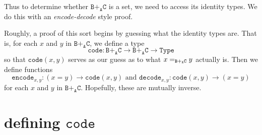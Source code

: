 \documentclass[12pt]{amsart}
\newcommand{\from}{\colon}
\newcommand{\type}[1]{\mathtt{#1}}
\newcommand{\A}{\type{A}}
\newcommand{\B}{\type{B}}
\newcommand{\C}{\type{C}}
\newcommand{\BAC}{\B +_{\A} \C}
\newcommand{\Type}{\type{Type}}
\newcommand{\code}{\type{code}}
\theoremstyle{remark}
\theoremstyle{definition}
\begin{document}
Thus to determine whether $\BAC$ is a set,
we need to access its identity types.  
We do this with an \emph{encode-decode} style proof.  

Roughly, a proof of this sort begins by guessing
what the identity types are.  That is,
for each $x$ and $y$ in $\BAC$, 
we define a type 
\[
	\code \from \BAC \to \BAC\to \Type
\]
so that $\code (x,y)$ serves as our guess  
as to what $x =_{\scriptsize \BAC} y$ actually is.  
Then we define functions
\[
	\type{ encode }_{ x , y } \from  ( x = y ) \to \code ( x , y ) 
	\text{ and }
	\type{ decode }_{ x , y } \from \code ( x , y ) \to ( x = y )
\]
for each $x$ and $y$ in $\BAC$.  
Hopefully, these are mutually inverse.

\pagebreak


\section{defining $\code$}
\end{document}
